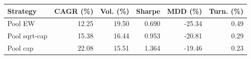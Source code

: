 \begin{tabular}{lrrrrr}
\toprule
Strategy & CAGR (\%) & Vol. (\%) & Sharpe & MDD (\%) & Turn. (\%) \\
\midrule
Pool EW & 12.25 & 19.50 & 0.690 & -25.34 & 0.49 \\
Pool sqrt-cap & 15.38 & 16.44 & 0.953 & -20.81 & 0.29 \\
Pool cap & 22.08 & 15.51 & 1.364 & -19.46 & 0.23 \\
\bottomrule
\end{tabular}
